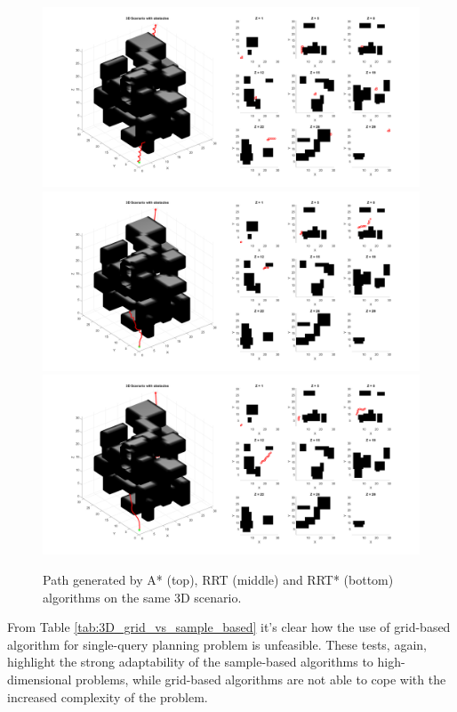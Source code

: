 \begin{figure}[H]
    \centering
    \includegraphics[width=1.0\textwidth]{./img/MATLAB/multidim/3D_a_star.pdf}
    \includegraphics[width=1.0\textwidth]{./img/MATLAB/multidim/3D_rrt.pdf}
    \includegraphics[width=1.0\textwidth]{./img/MATLAB/multidim/3D_rrt_star.pdf}
    \caption{Path generated by A* (top), RRT (middle) and RRT* (bottom) algorithms on the same 3D scenario.}
    \label{fig:3D_grid_vs_sample_based}
\end{figure}

From Table \ref{tab:3D_grid_vs_sample_based} it's clear how the use of grid-based algorithm for single-query planning problem is unfeasible.
These tests, again, highlight the strong adaptability of the sample-based algorithms to high-dimensional problems, while grid-based algorithms are not able to cope with the increased complexity of the problem.

